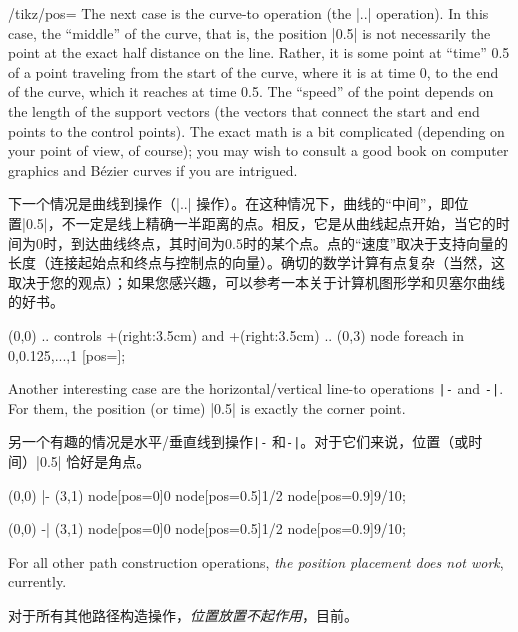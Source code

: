 \begin{key}{/tikz/pos=}
    The next case is the curve-to operation (the |..| operation). In this case,
    the ``middle'' of the curve, that is, the position |0.5| is not necessarily
    the point at the exact half distance on the line. Rather, it is some point
    at ``time'' 0.5 of a point traveling from the start of the curve, where it
    is at time 0, to the end of the curve, which it reaches at time 0.5. The
    ``speed'' of the point depends on the length of the support vectors (the
    vectors that connect the start and end points to the control points). The
    exact math is a bit complicated (depending on your point of view, of
    course); you may wish to consult a good book on computer graphics and
    Bézier curves if you are intrigued.
    
    下一个情况是曲线到操作（|..| 操作）。在这种情况下，曲线的“中间”，即位置|0.5|，不一定是线上精确一半距离的点。相反，它是从曲线起点开始，当它的时间为0时，到达曲线终点，其时间为0.5时的某个点。点的“速度”取决于支持向量的长度（连接起始点和终点与控制点的向量）。确切的数学计算有点复杂（当然，这取决于您的观点）；如果您感兴趣，可以参考一本关于计算机图形学和贝塞尔曲线的好书。

\begin{codeexample}[]
\tikz \draw (0,0) .. controls +(right:3.5cm) and +(right:3.5cm) .. (0,3)
  node foreach \p in {0,0.125,...,1} [pos=\p]{\p};
\end{codeexample}

    Another interesting case are the horizontal/vertical line-to operations
    \verb!|-! and \verb!-|!. For them, the position (or time) |0.5| is exactly
    the corner point.
    
    另一个有趣的情况是水平/垂直线到操作\verb!|-! 和\verb!-|!。对于它们来说，位置（或时间）|0.5| 恰好是角点。

\begin{codeexample}[]
\tikz \draw (0,0) |- (3,1)
  node[pos=0]{0} node[pos=0.5]{1/2} node[pos=0.9]{9/10};
\end{codeexample}

\begin{codeexample}[]
\tikz \draw (0,0) -| (3,1)
  node[pos=0]{0} node[pos=0.5]{1/2} node[pos=0.9]{9/10};
\end{codeexample}

    For all other path construction operations, \emph{the position placement
    does not work}, currently.

    对于所有其他路径构造操作，\emph{位置放置不起作用}，目前。
\end{key}

